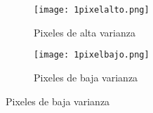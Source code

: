 \documentclass[10pt,a4paper]{article}
\begin{document}
\begin{figure}[ht!]
	\begin{subfigure}{0.5\textwidth}
		\texttt{[image: 1pixelalto.png]} 
		\caption{Pixeles de alta varianza}
		\label{fig:subfig1}
	\end{subfigure}
	\begin{subfigure}{0.5\textwidth}
		\texttt{[image: 1pixelbajo.png]}
		\caption{Pixeles de baja varianza}
		\label{fig:subfig2}
	\end{subfigure}
	\label{fig:subfigs}
\end{figure}
\end{document}
